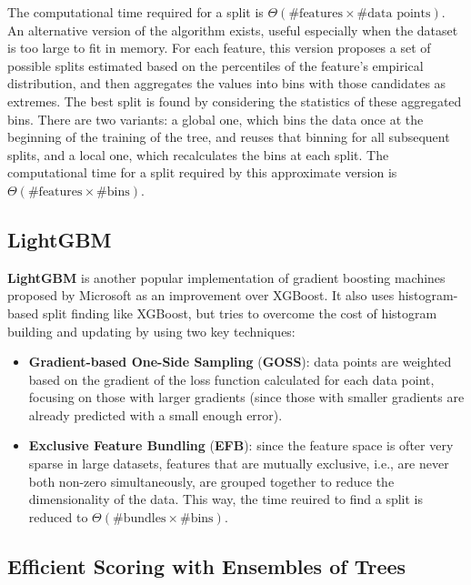 The computational time required for a split is $\Theta (\# \text{features} \times \# \text{data points})$. An alternative version of the algorithm exists, useful especially when the dataset is too large to fit in memory. For each feature, this version proposes a set of possible splits estimated based on the percentiles of the feature's empirical distribution, and then aggregates the values into bins with those candidates as extremes. The best split is found by considering the statistics of these aggregated bins. There are two variants: a global one, which bins the data once at the beginning of the training of the tree, and reuses that binning for all subsequent splits, and a local one, which recalculates the bins at each split. The computational time for a split required by this approximate version is $\Theta (\# \text{features} \times \# \text{bins})$.

\subsection{LightGBM}

\textbf{LightGBM} is another popular implementation of gradient boosting machines proposed by Microsoft as an improvement over XGBoost. It also uses histogram-based split finding like XGBoost, but tries to overcome the cost of histogram building and updating by using two key techniques:
\begin{itemize}
    \item \textbf{Gradient-based One-Side Sampling} (\textbf{GOSS}): data points are weighted based on the gradient of the loss function calculated for each data point, focusing on those with larger gradients (since those with smaller gradients are already predicted with a small enough error).

    \item \textbf{Exclusive Feature Bundling} (\textbf{EFB}): since the feature space is ofter very sparse in large datasets, features that are mutually exclusive, i.e., are never both non-zero simultaneously, are grouped together to reduce the dimensionality of the data. This way, the time reuired to find a split is reduced to $\Theta (\# \text{bundles} \times \# \text{bins})$.
\end{itemize}

\subsection{Efficient Scoring with Ensembles of Trees}

